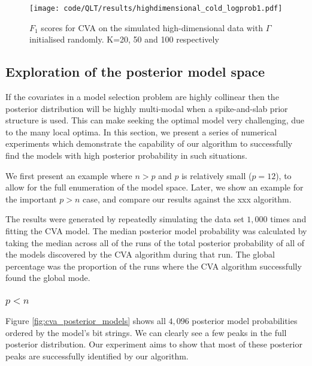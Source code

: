 \documentclass{amsart}[12pt]
\begin{document}
\begin{figure}\label{fig:highdim_cold_start}
\caption{$F_1$ scores for CVA on the simulated high-dimensional data with $\Gamma$ initialised randomly.
					K=20, 50 and 100 respectively}
\texttt{[image: code/QLT/results/highdimensional\_cold\_logprob1.pdf]}
\end{figure}

\subsection{Exploration of the posterior model space}

If the covariates in a model selection problem are highly collinear then the posterior distribution will be
highly multi-modal when a spike-and-slab prior structure is used. This can make seeking the optimal model very
challenging, due to the many local optima. In this section, we present a series of numerical experiments which
demonstrate the capability of our algorithm to successfully find the models with high posterior probability in
such situations.

We first present an example where $n > p$ and $p$ is relatively small ($p = 12$), to allow for the full 
enumeration of the model space. Later, we show an example for the important $p > n$ case, and compare our results 
against the xxx algorithm.

The results were generated by repeatedly simulating the data set $1,000$ times and fitting the CVA model.
The median posterior model probability was calculated by taking the median across all of the runs of the
total posterior probability of all of the models discovered by the CVA algorithm during that run. The global
percentage was the proportion of the runs where the CVA algorithm successfully found the global mode.

\subsubsection{$p < n$}
Figure \ref{fig:cva_posterior_models} shows all $4,096$ posterior model probabilities ordered by the model's bit
strings. We can clearly see a few peaks in the full posterior distribution. Our experiment aims to show that
most of these posterior peaks are successfully identified by our algorithm.
\end{document}
